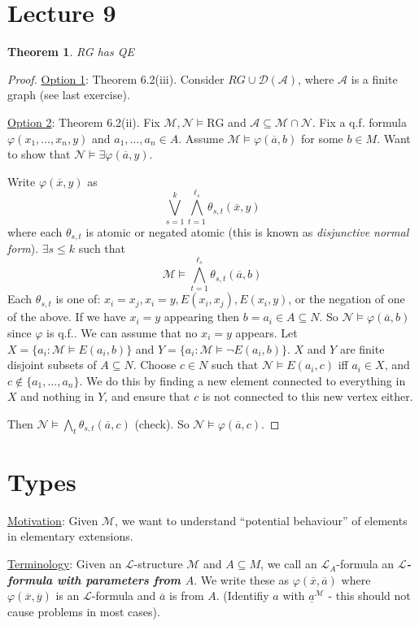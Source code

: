\documentclass[]{article}
\theoremstyle{custhm}
\newtheorem{theorem}{Theorem}[section]
\theoremstyle{cusdef}
\theoremstyle{custhm}
\theoremstyle{custhm}
\theoremstyle{custhm}
\theoremstyle{ex}
\theoremstyle{custhm}
\theoremstyle{cusdef}
\theoremstyle{remark}
\theoremstyle{remark}
\theoremstyle{numremark}
\newcommand{\undf}[1]{\textit{\textbf{#1}}}
\renewcommand{\L}{\mathcal{L}}
\newcommand{\M}{\mathcal{M}}
\renewcommand{\phi}{\varphi}
\renewcommand{\bar}{\overline}
\newcommand{\N}{\mathcal{N}}
\newcommand{\A}{\mathcal{A}}
\newcommand{\D}{\mathcal{D}}
\renewcommand{\subset}{\subseteq}
\begin{document}
\section{Lecture 9}

\begin{theorem}
RG has QE
\end{theorem}
\begin{proof}
\underline{Option 1}: Theorem 6.2(iii). Consider $RG \cup \D(\A)$, where $\A$ is a finite graph (see last exercise).

\underline{Option 2}: Theorem 6.2(ii). Fix $\M,\N\models \textrm{RG}$ and $\A\subset \M\cap \N$. Fix a q.f. formula $\phi(x_1,\dots,x_n,y)$ and $a_1,\dots,a_n\in A$. Assume $\M\models \phi(\bar{a},b)$ for some $b\in M$. Want to show that $\N\models \exists \phi(\bar{a},y)$.

Write $\phi(\bar{x},y)$ as $$\bigvee_{s=1}^{k}\bigwedge_{t=1}^{\ell_s}\theta_{s,t}(\bar{x},y)$$ where each $\theta_{s,t}$ is atomic or negated atomic (this is known as \textit{disjunctive normal form}). $\exists s\le k$ such that $$\M\models\bigwedge_{t=1}^{\ell_s}\theta_{s,t}(\bar{a},b)$$
Each $\theta_{s,t}$ is one of: $x_i = x_j, x_i = y,E(x_i,x_j),E(x_i,y)$, or the negation of one of the above. If we have $x_i = y$ appearing then $b = a_i\in A\subset N$. So $\N \models \phi(\bar{a},b)$ since $\phi$ is q.f.. We can assume that no $x_i = y$ appears. Let $X = \{a_i:\M\models E(a_i,b)\}$ and $Y = \{a_i : \M\models \neg E(a_i,b)\}$. $X$ and $Y$ are finite disjoint subsets of $A\subset N$. Choose $c\in N$ such that $\N\models E(a_i,c)$ iff $a_i \in X$, and $c\not\in\{a_1,\dots,a_n\}$. We do this by finding a new element connected to everything in $X$ and nothing in $Y$, and ensure that $c$ is not connected to this new vertex either.

Then $\N\models \bigwedge_{t}\theta_{s,t}(\bar{a},c)$ (check). So $\N\models \phi(\bar{a},c)$.
\end{proof}

\section*{Types}

\underline{Motivation}: Given $\M$, we want to understand ``potential behaviour'' of elements in elementary extensions.

\underline{Terminology}: Given an $\L$-structure $\M$ and $A\subset M$, we call an $\L_A$-formula an \undf{$\L$-formula with parameters from $A$}. We write these as $\phi(\bar{x},\bar{a})$ where $\phi(\bar{x},\bar{y})$ is an $\L$-formula and $\bar{a}$ is from $A$. (Identifiy $a$ with $\underline{a}^\M$ - this should not cause problems in most cases).
\end{document}
